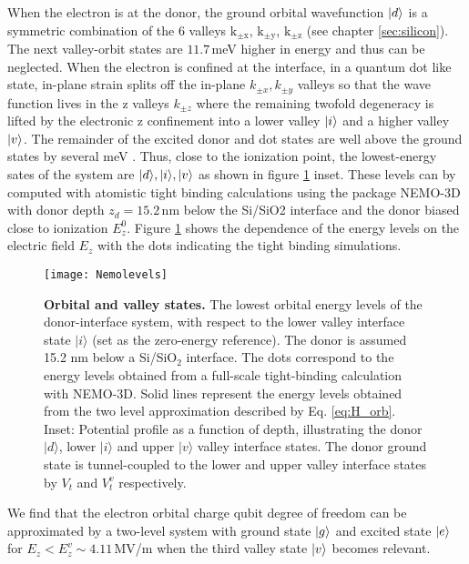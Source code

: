 When the electron is at the donor, the ground orbital wavefunction $|d\rangle$ is a symmetric combination of the 6 valleys $\mathrm{k_{\pm x}}$, $\mathrm{k_{\pm y}} $, $\mathrm{k_{\pm z}} $ (see chapter \ref{sec:silicon}). The next valley-orbit states are $11.7\,$meV higher in energy and thus can be neglected. When the electron is confined at the interface, in a quantum dot like state, in-plane strain splits off the in-plane $k_{\pm x}, k_{\pm y}$ valleys so that the wave function lives in the z valleys $k_{\pm z}$ where the remaining twofold degeneracy is lifted by the electronic z confinement into a lower valley $|i\rangle$ and a higher valley $|v\rangle$. The remainder of the excited donor and dot states are well above the ground states by several meV \cite{Rahman2009, Calderon2009}. Thus, close to the ionization point, the lowest-energy sates of the system are $|d\rangle, |i\rangle, |v\rangle$ as shown in figure \ref{fig:nemolevels} inset. 
These levels can by computed with atomistic tight binding calculations using the package NEMO-3D \cite{Klimeck2007a, Klimeck2007b} with donor depth $z_d=15.2\,$nm below the Si/SiO2 interface and the donor biased close to ionization $E_z^0$. Figure \ref{fig:nemolevels} shows the dependence of the energy levels on the electric field $E_z$ with the dots indicating the tight binding simulations. 

\begin{figure}[h]
	\centering
	\texttt{[image: Nemolevels]}
	\caption[Orbital and valley states]{\textbf{Orbital and valley states.} The lowest orbital energy levels of the donor-interface system, with respect to the lower valley interface state $\lvert i \rangle$ (set as the zero-energy reference). The donor is assumed 15.2 nm below a Si/SiO$_2$ interface. The dots correspond to the energy levels obtained from a full-scale tight-binding calculation with NEMO-3D. Solid lines represent the energy levels obtained from the two level approximation described by Eq. \ref{eq:H_orb}. Inset: Potential profile as a function of depth, illustrating the donor $\lvert d \rangle$, lower $\lvert i \rangle$ and upper $\lvert v \rangle$ valley interface states. The donor ground state is tunnel-coupled to the lower and upper valley interface states by $V_t$ and $V_t^v$  respectively.}
	\label{fig:nemolevels}
\end{figure}

We find that the electron orbital charge qubit degree of freedom can be approximated by a two-level system with ground state $|g\rangle$ and excited state $|e\rangle$ for $E_z<E_z^v\sim 4.11\,$MV/m when the third valley state $|v\rangle$ becomes relevant. 

